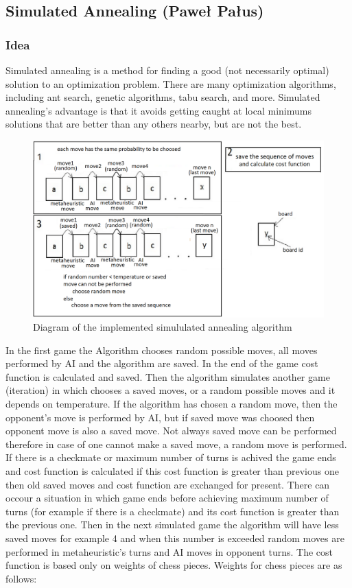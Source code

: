 \documentclass[pdftex]{article}
\begin{document}
\subsection{Simulated Annealing (Paweł Pałus)}
\label{sec:annealing}

\subsubsection{Idea}
Simulated annealing is a method for finding a good (not necessarily optimal) solution to an optimization problem.
There are many optimization algorithms, including ant search, genetic algorithms, tabu search, and more. Simulated annealing's advantage is that it avoids getting caught at local minimums solutions that are better than any others nearby, but are not the best.

\begin{figure}[!htb]
	\centering
	\includegraphics[width=1\textwidth]{annealing/annealingSchema.png} 
	\caption{Diagram of the implemented simululated annealing algorithm}
	\label{fig:annealingSchema}
\end{figure}

In the first game the Algorithm chooses random possible moves, all moves performed by AI and the algorithm are saved. In the end of the game cost function is calculated and saved. Then the algorithm simulates another game (iteration) in which chooses a saved moves, or a random possible moves and it depends on temperature. If the algorithm has chosen a random move, then the opponent's move is performed by AI, but if saved move was choosed then opponent move is also a saved move. Not always saved move can be performed therefore in case of one cannot make a saved move, a random move is performed. If there is a checkmate or maximum number of turns is achived the game ends and cost function is calculated if this cost function is greater than previous one then old saved moves and cost function are exchanged for present. There can occour a situation in which game ends before achieving maximum number of turns (for example if there is a checkmate) and its cost function is greater than the previous one. Then in the next simulated game the algorithm will have less saved moves for example 4 and when this number is exceeded random moves are performed in metaheuristic's turns and AI moves in opponent turns. The cost function is based only on weights of chess pieces. Weights for chess pieces are as follows:
\end{document}
